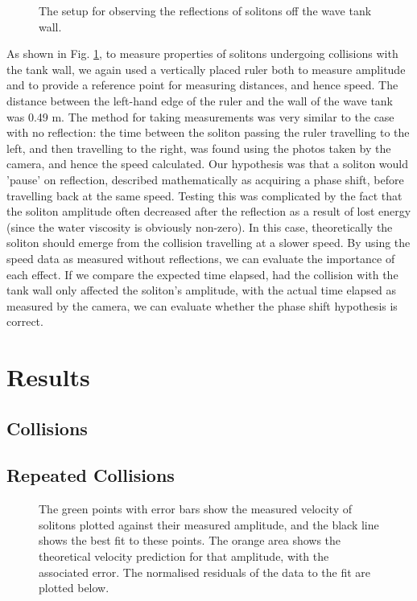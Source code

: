 \documentclass[10pt, twocolumn]{revtex4}    %
\begin{document}
\begin{figure}[h]
\caption{The setup for observing the reflections of solitons off the wave tank wall.}
\label{Diagram2}
\end{figure}

As shown in Fig. \ref{Diagram2}, to measure properties of solitons undergoing collisions with the tank wall, we again used a vertically placed ruler both to measure amplitude and to provide a reference point for measuring distances, and hence speed. The distance between the left-hand edge of the ruler and the wall of the wave tank was 0.49 m. The method for taking measurements was very similar to the case with no reflection: the time between the soliton passing the ruler travelling to the left, and then travelling to the right, was found using the photos taken by the camera, and hence the speed calculated. Our hypothesis was that a soliton would 'pause' on reflection, described mathematically as acquiring a phase shift, before travelling back at the same speed. Testing this was complicated by the fact that the soliton amplitude often decreased after the reflection as a result of lost energy (since the water viscosity is obviously non-zero). In this case, theoretically the soliton should emerge from the collision travelling at a slower speed. By using the speed data as measured without reflections, we can evaluate the importance of each effect. If we compare the expected time elapsed, had the collision with the tank wall only affected the soliton's amplitude, with the actual time elapsed as measured by the camera, we can evaluate whether the phase shift hypothesis is correct. 


\section{Results} \label{Results}

\subsection{Collisions}

\subsection{Repeated Collisions}

\begin{figure}[h]
\caption{The green points with error bars show the measured velocity of solitons plotted against their measured amplitude, and the black line shows the best fit to these points. The orange area shows the theoretical velocity prediction for that amplitude, with the associated error. The normalised residuals of the data to the fit are plotted below.}
\label{Graph1}
\end{figure}
\end{document}
